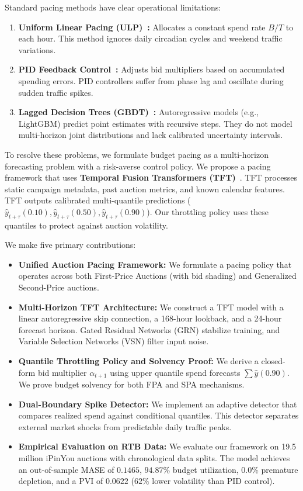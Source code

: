 \documentclass[sigconf]{acmart}
\begin{document}
Standard pacing methods have clear operational limitations:
\begin{enumerate}
    \item \textbf{Uniform Linear Pacing (ULP)~\cite{xu2015smart}:} Allocates a constant spend rate $B/T$ to each hour. This method ignores daily circadian cycles and weekend traffic variations.
    \item \textbf{PID Feedback Control~\cite{lee2013real}:} Adjusts bid multipliers based on accumulated spending errors. PID controllers suffer from phase lag and oscillate during sudden traffic spikes.
    \item \textbf{Lagged Decision Trees (GBDT)~\cite{ke2017lightgbm}:} Autoregressive models (e.g., LightGBM) predict point estimates with recursive steps. They do not model multi-horizon joint distributions and lack calibrated uncertainty intervals.
\end{enumerate}

To resolve these problems, we formulate budget pacing as a multi-horizon forecasting problem with a risk-averse control policy. We propose a pacing framework that uses \textbf{Temporal Fusion Transformers (TFT)}~\cite{lim2021temporal}. TFT processes static campaign metadata, past auction metrics, and known calendar features. TFT outputs calibrated multi-quantile predictions ($\hat{y}_{t+\tau}(0.10), \hat{y}_{t+\tau}(0.50), \hat{y}_{t+\tau}(0.90)$). Our throttling policy uses these quantiles to protect against auction volatility.

We make five primary contributions:
\begin{itemize}
    \item \textbf{Unified Auction Pacing Framework:} We formulate a pacing policy that operates across both First-Price Auctions (with bid shading) and Generalized Second-Price auctions.
    \item \textbf{Multi-Horizon TFT Architecture:} We construct a TFT model with a linear autoregressive skip connection, a 168-hour lookback, and a 24-hour forecast horizon. Gated Residual Networks (GRN) stabilize training, and Variable Selection Networks (VSN) filter input noise.
    \item \textbf{Quantile Throttling Policy and Solvency Proof:} We derive a closed-form bid multiplier $\alpha_{t+1}$ using upper quantile spend forecasts $\sum \hat{y}(0.90)$. We prove budget solvency for both FPA and SPA mechanisms.
    \item \textbf{Dual-Boundary Spike Detector:} We implement an adaptive detector that compares realized spend against conditional quantiles. This detector separates external market shocks from predictable daily traffic peaks.
    \item \textbf{Empirical Evaluation on RTB Data:} We evaluate our framework on 19.5 million iPinYou auctions with chronological data splits. The model achieves an out-of-sample MASE of $0.1465$, $94.87\%$ budget utilization, $0.0\%$ premature depletion, and a PVI of $0.0622$ ($62\%$ lower volatility than PID control).
\end{itemize}
\end{document}
